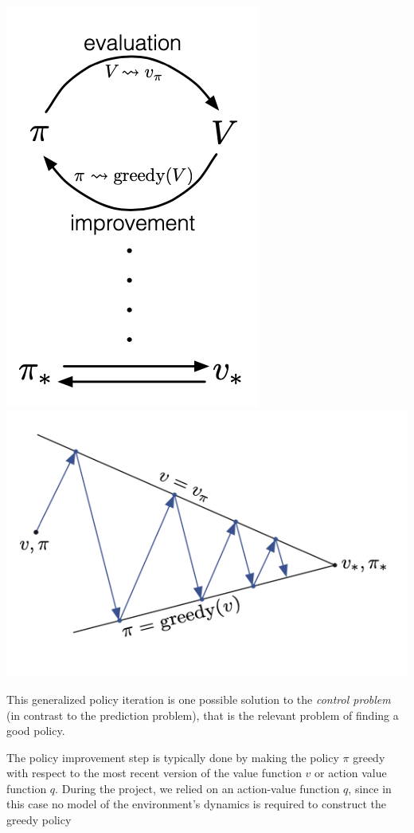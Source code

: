 \begin{center}
\includegraphics[scale=0.75]{graphics/generalized_policy_iteration.png}
\includegraphics[scale=1]{graphics/generalized_policy_iteration_2.png}
\end{center}

This generalized policy iteration is one possible solution to the \emph{control problem} (in contrast to the prediction problem), that is the relevant problem of finding a good policy. 

The policy improvement step is typically done by making the policy $\pi$ greedy with respect to the most recent version of the value function $v$ or action value function $q$. During the project, we relied on an action-value function $q$, since in this case no model of the environment's dynamics is required to construct the greedy policy 

